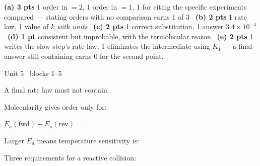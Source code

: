 \documentclass{apchem-worksheet}
\begin{document}
\begin{apcnote}
\textbf{(a) 3 pts} 1 order in  $=2$, 1 order in  $=1$, 1 for
citing the specific experiments compared --- stating orders with no
comparison earns 1 of 3 \textbullet\ \textbf{(b) 2 pts} 1 rate law, 1 value
of $k$ \emph{with units} \textbullet\ \textbf{(c) 2 pts} 1 correct
substitution, 1 answer $3.4\times10^{-4}$ \textbullet\ \textbf{(d) 1 pt}
consistent but improbable, with the termolecular reason \textbullet\
\textbf{(e) 2 pts} 1 writes the slow step's rate law, 1 eliminates the
intermediate using $K_1$ --- a final answer still containing \ce{N2O2}
earns 0 for the second point.
\end{apcnote}

\begin{spiralstrip}{Unit 5 \textbullet\ blocks 1--5}
  \item A final rate law must not contain:
  \item Molecularity gives order only for:
  \item $E_a(\text{fwd}) - E_a(\text{rev}) = $
  \item Larger $E_a$ means temperature sensitivity is:
  \item Three requirements for a reactive collision:
\end{spiralstrip}
\end{document}
